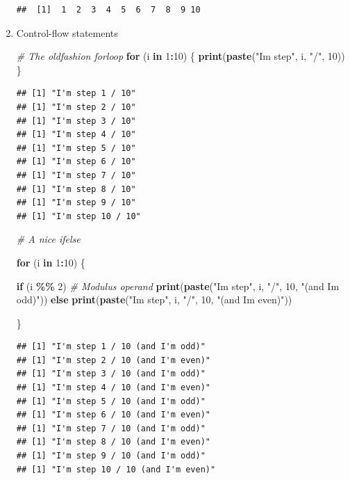 \documentclass[
]{book}
\newenvironment{Shaded}{\begin{snugshade}}{\end{snugshade}}
\newcommand{\CommentTok}[1]{\textcolor[rgb]{0.56,0.35,0.01}{\textit{#1}}}
\newcommand{\ControlFlowTok}[1]{\textcolor[rgb]{0.13,0.29,0.53}{\textbf{#1}}}
\newcommand{\DecValTok}[1]{\textcolor[rgb]{0.00,0.00,0.81}{#1}}
\newcommand{\FunctionTok}[1]{\textcolor[rgb]{0.13,0.29,0.53}{\textbf{#1}}}
\newcommand{\NormalTok}[1]{#1}
\newcommand{\SpecialCharTok}[1]{\textcolor[rgb]{0.81,0.36,0.00}{\textbf{#1}}}
\newcommand{\StringTok}[1]{\textcolor[rgb]{0.31,0.60,0.02}{#1}}
\begin{document}
\begin{enumerate}
\begin{verbatim}
##  [1]  1  2  3  4  5  6  7  8  9 10
\end{verbatim}
\item
  Control-flow statements

\begin{Shaded}
\begin{Highlighting}[]
\CommentTok{\# The oldfashion forloop}
\ControlFlowTok{for}\NormalTok{ (i }\ControlFlowTok{in} \DecValTok{1}\SpecialCharTok{:}\DecValTok{10}\NormalTok{) \{}
  \FunctionTok{print}\NormalTok{(}\FunctionTok{paste}\NormalTok{(}\StringTok{"I\textquotesingle{}m step"}\NormalTok{, i, }\StringTok{"/"}\NormalTok{, }\DecValTok{10}\NormalTok{))}
\NormalTok{\}}
\end{Highlighting}
\end{Shaded}

\begin{verbatim}
## [1] "I'm step 1 / 10"
## [1] "I'm step 2 / 10"
## [1] "I'm step 3 / 10"
## [1] "I'm step 4 / 10"
## [1] "I'm step 5 / 10"
## [1] "I'm step 6 / 10"
## [1] "I'm step 7 / 10"
## [1] "I'm step 8 / 10"
## [1] "I'm step 9 / 10"
## [1] "I'm step 10 / 10"
\end{verbatim}

\begin{Shaded}
\begin{Highlighting}[]
\CommentTok{\# A nice ifelse}

\ControlFlowTok{for}\NormalTok{ (i }\ControlFlowTok{in} \DecValTok{1}\SpecialCharTok{:}\DecValTok{10}\NormalTok{) \{}

  \ControlFlowTok{if}\NormalTok{ (i }\SpecialCharTok{\%\%} \DecValTok{2}\NormalTok{) }\CommentTok{\# Modulus operand}
    \FunctionTok{print}\NormalTok{(}\FunctionTok{paste}\NormalTok{(}\StringTok{"I\textquotesingle{}m step"}\NormalTok{, i, }\StringTok{"/"}\NormalTok{, }\DecValTok{10}\NormalTok{, }\StringTok{"(and I\textquotesingle{}m odd)"}\NormalTok{))}
  \ControlFlowTok{else}
    \FunctionTok{print}\NormalTok{(}\FunctionTok{paste}\NormalTok{(}\StringTok{"I\textquotesingle{}m step"}\NormalTok{, i, }\StringTok{"/"}\NormalTok{, }\DecValTok{10}\NormalTok{, }\StringTok{"(and I\textquotesingle{}m even)"}\NormalTok{))}

\NormalTok{\}}
\end{Highlighting}
\end{Shaded}

\begin{verbatim}
## [1] "I'm step 1 / 10 (and I'm odd)"
## [1] "I'm step 2 / 10 (and I'm even)"
## [1] "I'm step 3 / 10 (and I'm odd)"
## [1] "I'm step 4 / 10 (and I'm even)"
## [1] "I'm step 5 / 10 (and I'm odd)"
## [1] "I'm step 6 / 10 (and I'm even)"
## [1] "I'm step 7 / 10 (and I'm odd)"
## [1] "I'm step 8 / 10 (and I'm even)"
## [1] "I'm step 9 / 10 (and I'm odd)"
## [1] "I'm step 10 / 10 (and I'm even)"
\end{verbatim}


\end{enumerate}
\end{document}
